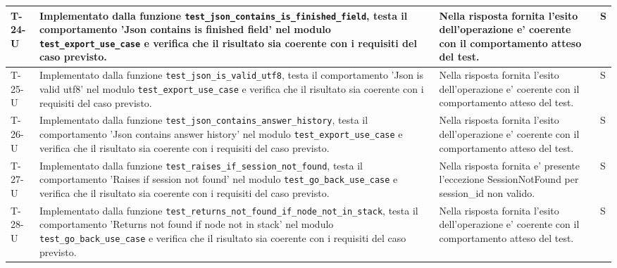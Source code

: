 \documentclass[a4paper,12pt]{article}
\begin{document}
{{\begin{longtable}{|>{\RaggedRight\arraybackslash}p{1.55cm}|>{\RaggedRight\arraybackslash}p{8.0cm}|>{\RaggedRight\arraybackslash}p{4.6cm}|>{\RaggedRight\arraybackslash}p{1.2cm}|}
        \hline
        T-24-U & Implementato dalla funzione \texttt{test\_\allowbreak json\_\allowbreak contains\_\allowbreak is\_\allowbreak finished\_\allowbreak field}, testa il comportamento 'Json contains is finished field' nel modulo \texttt{test\_\allowbreak export\_\allowbreak use\_\allowbreak case} e verifica che il risultato sia coerente con i requisiti del caso previsto. & Nella risposta fornita l'esito dell'operazione e' coerente con il comportamento atteso del test. & S \\
        \hline
        T-25-U & Implementato dalla funzione \texttt{test\_\allowbreak json\_\allowbreak is\_\allowbreak valid\_\allowbreak utf8}, testa il comportamento 'Json is valid utf8' nel modulo \texttt{test\_\allowbreak export\_\allowbreak use\_\allowbreak case} e verifica che il risultato sia coerente con i requisiti del caso previsto. & Nella risposta fornita l'esito dell'operazione e' coerente con il comportamento atteso del test. & S \\
        \hline
        T-26-U & Implementato dalla funzione \texttt{test\_\allowbreak json\_\allowbreak contains\_\allowbreak answer\_\allowbreak history}, testa il comportamento 'Json contains answer history' nel modulo \texttt{test\_\allowbreak export\_\allowbreak use\_\allowbreak case} e verifica che il risultato sia coerente con i requisiti del caso previsto. & Nella risposta fornita l'esito dell'operazione e' coerente con il comportamento atteso del test. & S \\
        \hline
        T-27-U & Implementato dalla funzione \texttt{test\_\allowbreak raises\_\allowbreak if\_\allowbreak session\_\allowbreak not\_\allowbreak found}, testa il comportamento 'Raises if session not found' nel modulo \texttt{test\_\allowbreak go\_\allowbreak back\_\allowbreak use\_\allowbreak case} e verifica che il risultato sia coerente con i requisiti del caso previsto. & Nella risposta fornita e' presente l'eccezione SessionNotFound per session\_id non valido. & S \\
        \hline
        T-28-U & Implementato dalla funzione \texttt{test\_\allowbreak returns\_\allowbreak not\_\allowbreak found\_\allowbreak if\_\allowbreak node\_\allowbreak not\_\allowbreak in\_\allowbreak stack}, testa il comportamento 'Returns not found if node not in stack' nel modulo \texttt{test\_\allowbreak go\_\allowbreak back\_\allowbreak use\_\allowbreak case} e verifica che il risultato sia coerente con i requisiti del caso previsto. & Nella risposta fornita l'esito dell'operazione e' coerente con il comportamento atteso del test. & S \\

\end{longtable}}}
\end{document}
